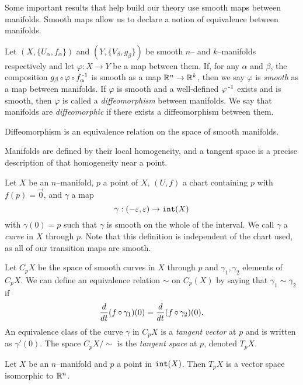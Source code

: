 Some important results that help build our theory use smooth maps between manifolds.
Smooth maps allow us to declare a notion of equivalence between manifolds.

\begin{defn}
	\label{def:smoothmap}
	Let $(X,\{U_\alpha,f_\alpha\})$ and $(Y,\{V_\beta,g_\beta\})$ be smooth $n$-- and $k$--manifolds respectively and let $\varphi:X\to Y$ be a map between them.
	If, for any $\alpha$ and $\beta$, the composition $g_\beta\comp \varphi\comp f_\alpha\inv$ is smooth as a map $\mathbb{R}^n\to\mathbb{R}^k$, then we say $\varphi$ is \emph{smooth} as a map between manifolds.
	If $\varphi$ is smooth and a well-defined $\varphi^{\,\text{-}1}$ exists and is smooth, then $\varphi$ is called a \emph{diffeomorphism} between manifolds.
	We say that manifolds are \emph{diffeomorphic} if there exists a diffeomorphism between them.
\end{defn}

\begin{prop}
	\label{prop:diffeoequiv}
	Diffeomorphism is an equivalence relation on the space of smooth manifolds.
\end{prop}

Manifolds are defined by their local homogeneity, and a tangent space is a precise description of that homogeneity near a point.

\begin{defn}
	\label{def:tangentspace}
	Let $X$ be an $n$--manifold, $p$ a point of $X$, $(U,f)$ a chart containing $p$ with $f(p)=\vec{0}$, and $\gamma$ a map $$\gamma:(-\varepsilon,\varepsilon)\to \mathtt{int}(X)$$
	with $\gamma(0)=p$ such that $\gamma$ is smooth on the whole of the interval.
	We call $\gamma$ a \emph{curve} in $X$ through $p$.
	Note that this definition is independent of the chart used, as all of our transition maps are smooth.
	
	Let $C_p X$ be the space of smooth curves in $X$ through $p$ and $\gamma_1, \gamma_2$ elements of $C_p X$.
	We can define an equivalence relation $\sim$ on $C_p(X)$ by saying that $\gamma_1\sim\gamma_2$ if
	\[
		\Ddt(f\comp\gamma_1)(0) = \Ddt(f\comp\gamma_2)(0).
	\]
	An equivalence class of the curve $\gamma$ in $C_p X$ is a \emph{tangent vector} at $p$ and is written as $\gamma'(0)$.
	The space $C_p X/\sim$ is the \emph{tangent space} at $p$, denoted $T_p X$.	
\end{defn}

\begin{prop}
	\label{prop:tangentspacevectorspace}
	Let $X$ be an $n$--manifold and $p$ a point in $\mathtt{int}(X)$.
	Then $T_p X$ is a vector space isomorphic to $\mathbb{R}^n$.
\end{prop}

